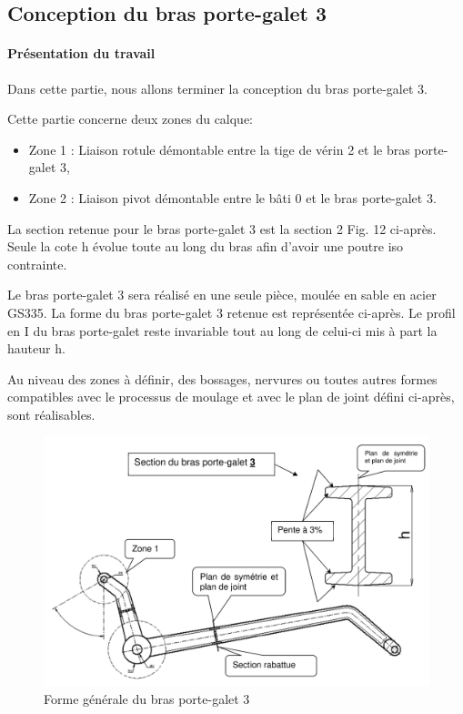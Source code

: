 \subsection{Conception du bras porte-galet 3}

\paragraph{Présentation du travail}

Dans cette partie, nous allons terminer la conception du bras porte-galet 3.

Cette partie concerne deux zones du calque:
\begin{itemize}
 \item Zone 1 : Liaison rotule démontable entre la tige de vérin 2 et le bras porte-galet 3,
 \item Zone 2 : Liaison pivot démontable entre le bâti 0 et le bras porte-galet 3.
\end{itemize}

La section retenue pour le bras porte-galet 3 est la section 2 Fig. 12 ci-après. Seule la cote h
évolue toute au long du bras afin d'avoir une poutre iso contrainte.

Le bras porte-galet 3 sera réalisé en une seule pièce, moulée en sable en acier GS335. La
forme du bras porte-galet 3 retenue est représentée ci-après. Le profil en I du bras porte-galet
reste invariable tout au long de celui-ci mis à part la hauteur h.

\newpage

Au niveau des zones à définir, des bossages, nervures ou toutes autres formes compatibles
avec le processus de moulage et avec le plan de joint défini ci-après, sont réalisables.

\begin{figure}[!h]
 \centering\includegraphics[width=0.7\linewidth]{img/fig14}
 \caption{Forme générale du bras porte-galet 3}
 \label{fig14}
\end{figure}

